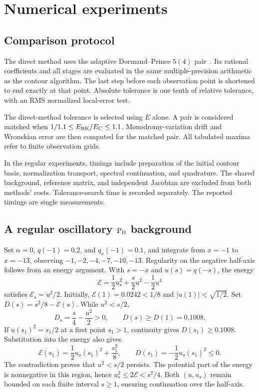 \section{Numerical experiments}\label{sec:experiments}
\subsection{Comparison protocol}
The direct method uses the adaptive Dormand--Prince $5(4)$
pair~\cite{DormandPrince80}. Its rational coefficients and all stages
are evaluated in the same multiple-precision arithmetic as the contour
algorithm. The last step before each observation point is shortened
to end exactly at that point. Absolute tolerance is one tenth of
relative tolerance, with an RMS normalized local-error test.

The direct-method tolerance is selected using $E$ alone.
A pair is considered matched when $1/1.1\le E_{\rm RK}/E_C\le1.1$.
Monodromy-variation drift and Wronskian error are then computed for
the matched pair. All tabulated maxima refer to finite observation grids.

In the regular experiments, timings include preparation of the initial
contour basis, normalization transport, spectral continuation, and
quadrature. The shared background, reference matrix, and independent
Jacobian are excluded from both methods' costs. Tolerance-search time
is recorded separately. The reported timings are single measurements.

\subsection{A regular oscillatory \texorpdfstring{$\mathrm{P}_{\mathrm{II}}$}{PII} background}
Set $\alpha=0$, $q(-1)=0.2$, and $q_x(-1)=0.1$, and integrate from
$x=-1$ to $x=-13$, observing $-1,-2,-4,-7,-10,-13$.
Regularity on the negative half-axis follows from an energy argument.
With $s=-x$ and $u(s)=q(-s)$, the energy
\[
 \mathcal E=\frac12u_s^2+\frac{s}{2}u^2-\frac12u^4
\]
satisfies $\mathcal E_s=u^2/2$.
Initially, $\mathcal E(1)=0.0242<1/8$ and $|u(1)|<\sqrt{1/2}$.
Set $D(s)=s^2/8-\mathcal E(s)$. While $u^2<s/2$,
\[
 D_s=\frac{s}{4}-\frac{u^2}{2}>0,\qquad
 D(s)\ge D(1)=0.1008.
\]
If $u(s_1)^2=s_1/2$ at a first point $s_1>1$, continuity gives
$D(s_1)\ge0.1008$. Substitution into the energy also gives
\[
 \mathcal E(s_1)=\frac12u_s(s_1)^2+\frac{s_1^2}{8},\qquad
 D(s_1)=-\frac12u_s(s_1)^2\le0.
\]
The contradiction proves that $u^2<s/2$ persists.
The potential part of the energy is nonnegative in this region, hence
$u_s^2\le2\mathcal E<s^2/4$. Both $(u,u_s)$ remain bounded on each
finite interval $s\ge1$, ensuring continuation over the half-axis.

